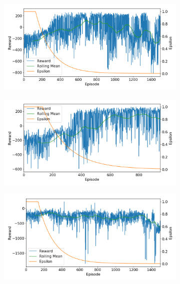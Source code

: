 \documentclass[10pt]{article}
\begin{document}
\begin{figure}[H]
  \centering
  \begin{subfigure}[b]{0.49\linewidth}
  \centering
  \includegraphics[width=\linewidth]{../logs/train_param_0051.png}
      \caption{}
  \label{fig:train_param_0051}
  \end{subfigure}
  \begin{subfigure}[b]{0.49\linewidth}
  \centering
  \includegraphics[width=\linewidth]{../logs/train_param_0045.png}
      \caption{}
  \label{fig:train_param_0045}
  \end{subfigure}
  \begin{subfigure}[b]{0.49\linewidth}
  \centering
  \includegraphics[width=\linewidth]{../logs/train_param_0082.png}

\end{subfigure}
\end{figure}
\end{document}
